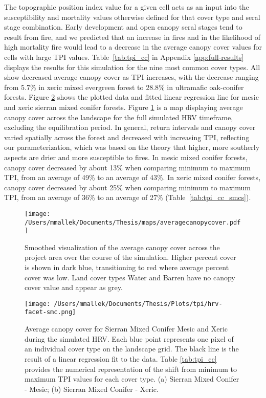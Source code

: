 The topographic position index value for a given cell acts as an input into the susceptibility and mortality values otherwise defined for that cover type and seral stage combination. Early development and open canopy seral stages tend to result from fire, and we predicted that an increase in fires and in the likelihood of high mortality fire would lead to a decrease in the average canopy cover values for cells with large TPI values. Table~\ref{tab:tpi_cc} in Appendix \ref{app:full-results} displays the results for this simulation for the nine most common cover types. All show decreased average canopy cover as TPI increases, with the decrease ranging from 5.7\% in xeric mixed evergreen forest to 28.8\% in ultramafic oak-conifer forests. Figure \ref{fig:tpi_cc_smc} shows the plotted data and fitted linear regression line for mesic and xeric sierran mixed conifer forests. Figure \ref{fig:averagecc} is a map displaying average canopy cover across the landscape for the full simulated HRV timeframe, excluding the equilibration period. In general, return intervals and canopy cover varied spatially across the forest and decreased with increasing TPI, reflecting our parameterization, which was based on the theory that higher, more southerly aspects are drier and more susceptible to fires. In mesic mixed conifer forests, canopy cover decreased by about 13\% when comparing minimum to maximum TPI, from an average of 49\% to an average of 43\%. In xeric mixed conifer forests, canopy cover decreased by about 25\% when comparing minimum to maximum TPI, from an average of 36\% to an average of 27\% (Table~\ref{tab:tpi_cc_smcs}).

\begin{figure}[!htbp]
\centering
\texttt{[image: /Users/mmallek/Documents/Thesis/maps/averagecanopycover.pdf]}
\caption{Smoothed visualization of the average canopy cover across the project area over the course of the simulation. Higher percent cover is shown in dark blue, transitioning to red where average percent cover was low. Land cover types Water and Barren have no canopy cover value and appear as grey.}
\label{fig:averagecc}
\end{figure}

\begin{figure}[!htbp]
\centering
\texttt{[image: /Users/mmallek/Documents/Thesis/Plots/tpi/hrv-facet-smc.png]}
\caption{Average canopy cover for Sierran Mixed Conifer Mesic and Xeric during the simulated HRV. Each blue point represents one pixel of an individual cover type on the landscape grid. The black line is the result of a linear regression fit to the data. Table \ref{tab:tpi_cc} provides the numerical representation of the shift from minimum to maximum TPI values for each cover type. (a) Sierran Mixed Conifer - Mesic; (b) Sierran Mixed Conifer - Xeric.} 
\label{fig:tpi_cc_smc}
\end{figure}

